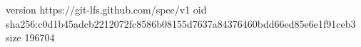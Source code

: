 version https://git-lfs.github.com/spec/v1
oid sha256:c0d1b45adcb2212072fc8586b08155d7637a84376460bdd66ed85e6e1f91ceb3
size 196704
